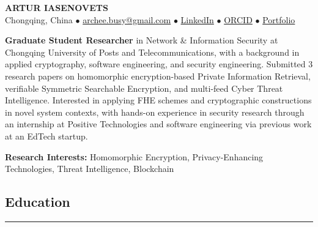 \documentclass[11pt,letterpaper]{article}
\begin{document}
\begin{center}
    {\LARGE \textbf{ARTUR IASENOVETS}} \\
    \vspace{0.1cm}
    Chongqing, China $\bullet$
    \href{mailto:archee.busy@gmail.com}{archee.busy@gmail.com} $\bullet$
    \href{https://linkedin.com/in/iasenovets}{LinkedIn} $\bullet$
    \href{https://orcid.org/0009-0008-0008-3746}{ORCID} $\bullet$
    \href{https://iasenovets.github.io/}{Portfolio}
\end{center}

\vspace{0.2cm}

\noindent
\textbf{Graduate Student Researcher} in Network \& Information Security at Chongqing University of Posts
and Telecommunications, with a background in applied cryptography, software engineering, and
security engineering. Submitted 3 research papers on homomorphic encryption-based
Private Information Retrieval, verifiable Symmetric Searchable Encryption, and multi-feed Cyber
Threat Intelligence. Interested in applying FHE schemes and cryptographic constructions in
novel system contexts, with hands-on experience in security research through an internship
at Positive Technologies and software engineering via previous work at an EdTech startup.

\vspace{0.15cm}

\noindent\textbf{Research Interests:} Homomorphic Encryption, Privacy-Enhancing Technologies,
Threat Intelligence, Blockchain

\vspace{0.3cm}

\subsection*{\Large Education}
\vspace{-0.5em}
\hrule
\vspace{0.3em}
\end{document}
